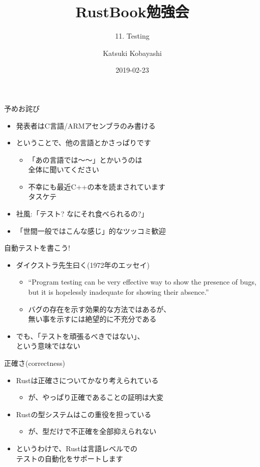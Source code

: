 \documentclass[cjk,14pt,xcolor=dvipsnames,table,dvipdfmx,professional font,t,fragile]{beamer}
\begin{document}
\title{RustBook勉強会}
\subtitle{11. Testing}
\author{Katsuki Kobayashi}
\date{2019-02-23}

\maketitle

\begin{frame}{予めお詫び}
 \begin{itemize}
  \item 発表者はC言語/ARMアセンブラのみ書ける
  \item ということで、他の言語とかさっぱりです
	\begin{itemize}
	 \item 「あの言語では〜〜」とかいうのは\\
	       全体に聞いてください
	 \item 不幸にも最近C++の本を読まされています\\
	       タスケテ
	\end{itemize}
  \item 社風:「テスト? なにそれ食べられるの?」
  \item 「世間一般ではこんな感じ」的なツッコミ歓迎
 \end{itemize}
\end{frame}

\begin{frame}{自動テストを書こう!}
 \begin{itemize}
  \item ダイクストラ先生曰く(1972年のエッセイ)
	\begin{itemize}
	 \item 	{\scriptsize
		``Program testing can be very effective way to show the presence of bugs,
		but it is hopelessly inadequate for showing their absence.''}
	 \item バグの存在を示す効果的な方法ではあるが、\\
	       無い事を示すには絶望的に不充分である
	\end{itemize}
  \item でも、「テストを頑張るべきではない」、\\
	という意味ではない
 \end{itemize}
\end{frame}

\begin{frame}{正確さ(correctness)}
 \begin{itemize}
  \item Rustは正確さについてかなり考えられている
	\begin{itemize}
	 \item が、やっぱり正確であることの証明は大変
	\end{itemize}
  \item Rustの型システムはこの重役を担っている
	\begin{itemize}
	 \item が、型だけで不正確を全部抑えられない
	\end{itemize}
  \item というわけで、Rustは言語レベルでの\\
	テストの自動化をサポートします
 \end{itemize}
\end{frame}
\end{document}
